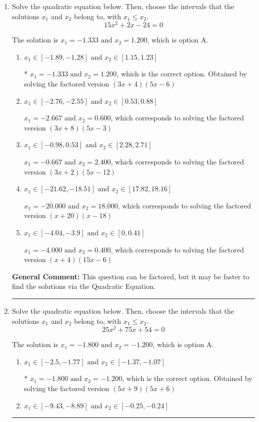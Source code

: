 \documentclass{extbook}[14pt]
\newcommand{\litem}[1]{\item #1

\rule{\textwidth}{0.4pt}}
\begin{document}
\begin{enumerate}\litem{
Solve the quadratic equation below. Then, choose the intervals that the solutions $x_1$ and $x_2$ belong to, with $x_1 \leq x_2$.
\[ 15x^{2} +2 x -24 = 0 \]

The solution is \( x_1 = -1.333 \text{ and } x_2 = 1.200 \), which is option A.\begin{enumerate}[label=\Alph*.]
\item \( x_1 \in [-1.89, -1.28] \text{ and } x_2 \in [1.15, 1.23] \)

* $x_1 = -1.333 \text{ and } x_2 = 1.200$, which is the correct option. Obtained by solving the factored version $(3x + 4)(5x -6)$
\item \( x_1 \in [-2.76, -2.55] \text{ and } x_2 \in [0.53, 0.88] \)

$x_1 = -2.667 \text{ and } x_2 = 0.600$, which corresponds to solving the factored version $(3x + 8)(5x -3)$
\item \( x_1 \in [-0.98, 0.53] \text{ and } x_2 \in [2.28, 2.71] \)

$x_1 = -0.667 \text{ and } x_2 = 2.400$, which corresponds to solving the factored version $(3x + 2)(5x -12)$
\item \( x_1 \in [-21.62, -18.51] \text{ and } x_2 \in [17.82, 18.16] \)

$x_1 = -20.000 \text{ and } x_2 = 18.000$, which corresponds to solving the factored version $(x + 20)(x -18)$
\item \( x_1 \in [-4.04, -3.9] \text{ and } x_2 \in [0, 0.41] \)

$x_1 = -4.000 \text{ and } x_2 = 0.400$, which corresponds to solving the factored version $(x + 4)(15x -6)$
\end{enumerate}

\textbf{General Comment:} This question can be factored, but it may be faster to find the solutions via the Quadratic Equation.
}
\litem{
Solve the quadratic equation below. Then, choose the intervals that the solutions $x_1$ and $x_2$ belong to, with $x_1 \leq x_2$.
\[ 25x^{2} +75 x + 54 = 0 \]

The solution is \( x_1 = -1.800 \text{ and } x_2 = -1.200 \), which is option A.\begin{enumerate}[label=\Alph*.]
\item \( x_1 \in [-2.5, -1.77] \text{ and } x_2 \in [-1.37, -1.07] \)

* $x_1 = -1.800 \text{ and } x_2 = -1.200$, which is the correct option. Obtained by solving the factored version $(5x + 9)(5x + 6)$
\item \( x_1 \in [-9.43, -8.89] \text{ and } x_2 \in [-0.25, -0.24] \)


\end{enumerate}}
\end{enumerate}
\end{document}
